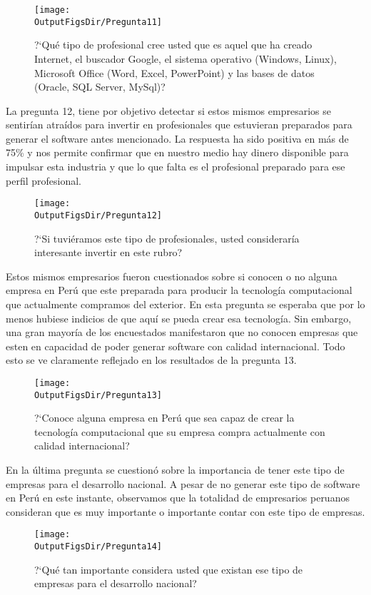 \begin{figure}[!h]
	\centering
	\texttt{[image: \\OutputFigsDir/Pregunta11]}
	\label{fig:Preg11}
	\caption{?`Qué tipo de profesional cree usted que es aquel que ha creado Internet, el buscador Google, el sistema operativo (Windows, Linux), Microsoft Office (Word, Excel, PowerPoint) y las bases de datos (Oracle, SQL Server, MySql)?}
\end{figure}

La pregunta 12, tiene por objetivo detectar si estos mismos empresarios se sentirían atraídos para invertir en profesionales que estuvieran preparados para generar el software antes mencionado. La respuesta ha sido positiva en más de 75\% y nos permite confirmar que en nuestro medio hay dinero disponible para impulsar esta industria y que lo que falta es el profesional preparado para ese perfil profesional.

\begin{figure}[!h]
	\centering
	\texttt{[image: \\OutputFigsDir/Pregunta12]}
	\label{fig:Preg12}
	\caption{?`Si tuviéramos este tipo de profesionales, usted consideraría interesante invertir en este rubro?}
\end{figure}

Estos mismos empresarios fueron cuestionados sobre si conocen o no alguna empresa en Perú que este preparada para producir la tecnología computacional que actualmente compramos del exterior. En esta pregunta se esperaba que por lo menos hubiese indicios de que aquí se pueda crear esa tecnología. Sin embargo, una gran mayoría de los encuestados manifestaron que no conocen empresas que esten en capacidad de poder generar software con calidad internacional. Todo esto se ve claramente reflejado en los resultados de la pregunta 13.

\begin{figure}[!h]
	\centering
	\texttt{[image: \\OutputFigsDir/Pregunta13]}
	\label{fig:Preg13}
	\caption{?`Conoce alguna empresa en Perú que sea capaz de crear la tecnología computacional que su empresa compra actualmente con calidad internacional?}
\end{figure}

En la última pregunta se cuestionó sobre la importancia de tener este tipo de empresas para el desarrollo nacional. A pesar de no generar este tipo de software en Perú en este instante, observamos que la totalidad de empresarios peruanos consideran que es muy importante o importante contar con este tipo de empresas.

\begin{figure}[!h]
	\centering
	\texttt{[image: \\OutputFigsDir/Pregunta14]}
	\label{fig:Preg14}
	\caption{?`Qué tan importante considera usted que existan ese tipo de empresas para el desarrollo nacional?}
\end{figure}


